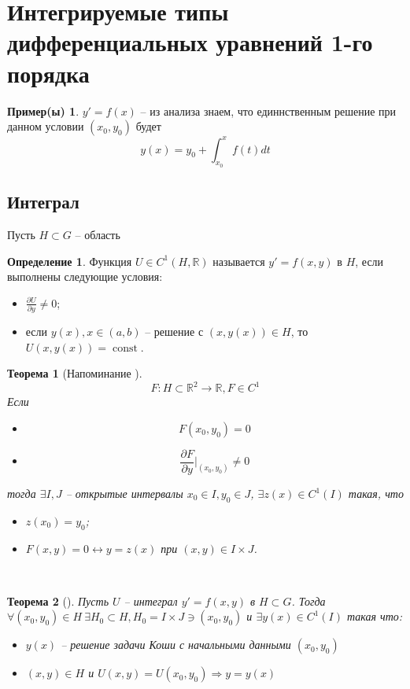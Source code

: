 \documentclass[a4paper]{article}
\theoremstyle{indented}
\newtheorem*{theorem}{Теорема}
\theoremstyle{definition}
\newtheorem*{defn}{Определение}
\newtheorem*{exl}{Пример(ы)}
\theoremstyle{remark}
\DeclareMathOperator{\const}{const}
\begin{document}
\section{Интегрируемые типы дифференциальных уравнений 1-го порядка}
\begin{exl}
  $y' = f(x)$ -- из анализа знаем, что единнственным решение при данном условии $(x_0,y_0)$ будет \[y(x) = y_0 + \int_{x_0}^xf(t)dt\]
\end{exl}
\subsection{Интеграл}
Пусть $H \subset G$ -- область
\begin{defn}
  Функция $U \in C^1(H,\mathbb{R})$ называется  $y' = f(x,y)$ в $H$, если выполнены следующие условия:
  \begin{itemize}
  \item $\frac{\partial U}{\partial y} \not = 0$;
  \item если $y(x), x \in (a,b)$ -- решение с $(x,y(x)) \in H$, то $U(x,y(x)) = \const$.
  \end{itemize}
\end{defn}
\begin{theorem}[Напоминание ]
  \[F : H \subset \mathbb{R}^2 \to \mathbb{R}, F \in C^1  \]
  Если
  \begin{itemize}
    \item
      \[F(x_0,y_0) = 0\]
    \item
      \[ \frac{\partial F}{\partial y}\bigg|_{(x_0,y_0)} \not  = 0\]
  \end{itemize}
  тогда $\exists I, J$ -- открытые интервалы $x_0 \in I, y_0 \in J$, $\exists z(x) \in C^1(I)$ такая, что
  \begin{itemize}
  \item $z(x_0) = y_0$;
  \item $F(x,y) = 0 \leftrightarrow y = z(x)$ при $(x,y) \in I \times J$.
  \end{itemize}
\end{theorem} \ 
\begin{theorem}[]
  Пусть $U$ -- интеграл $y' = f(x,y)$ в $H \subset G$. Тогда $\forall (x_0,y_0) \in H \ \exists H_0 \subset H, H_0 = I \times J \ni (x_0,y_0)$ и $\exists y(x) \in C^1(I)$ такая что:
  \begin{itemize}
    \item $y(x)$ -- решение задачи Коши с начальными данными $(x_0,y_0)$
    \item $(x,y) \in  H$ и $U(x,y) = U(x_0,y_0) \Rightarrow y = y(x)$
  \end{itemize}
\end{theorem}
\end{document}
